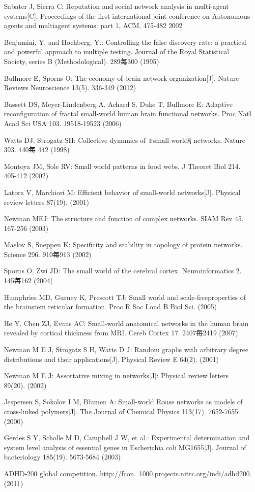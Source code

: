 \documentclass{llncs}
\begin{document}
\begin{thebibliography}{}
Sabater J, Sierra C:
Reputation and social network analysis in multi-agent systems[C].
Proceedings of the first international joint conference on Autonomous agents and multiagent systems: part 1, ACM. 475-482 2002

Benjamini, Y. and Hochberg, Y.:
Controlling the false discovery rate: a practical and powerful approach to multiple testing.
Journal of the Royal Statistical Society, series B (Methodological). 289每300 (1995)

Bullmore E, Sporns O:
The economy of brain network organization[J].
Nature Reviews Neuroscience 13(5). 336-349 (2012)

Bassett DS, Meyer-Lindenberg A, Achard S, Duke T, Bullmore E:
Adaptive reconfiguration of fractal small-world human brain functional networks.
Proc Natl Acad Sci USA 103. 19518-19523 (2006)

Watts DJ, Strogatz SH:
Collective dynamics of ※small-world§ networks.
Nature 393. 440每 442 (1998)

Montoya JM, Sole RV:
Small world patterns in food webs.
J Theoret Biol 214. 405-412 (2002)

Latora V, Marchiori M:
Efficient behavior of small-world networks[J].
Physical review letters 87(19). (2001)

Newman MEJ:
The structure and function of complex networks.
SIAM Rev 45. 167-256 (2003)

Maslov S, Sneppen K:
Specificity and stability in topology of protein networks.
Science 296. 910每913 (2002)

Sporns O, Zwi JD:
The small world of the cerebral cortex.
Neuroinformatics 2. 145每162 (2004)

Humphries MD, Gurney K, Prescott TJ:
Small world and scale-freeproperties of the brainstem reticular formation.
Proc R Soc Lond B Biol Sci. (2005)

He Y, Chen ZJ, Evans AC:
Small-world anatomical networks in the human brain revealed by cortical thickness from MRI.
Cereb Cortex 17. 2407每2419 (2007)

Newman M E J, Strogatz S H, Watts D J:
Random graphs with arbitrary degree distributions and their applications[J].
Physical Review E 64(2). (2001)

Newman M E J:
Assortative mixing in networks[J]:
Physical review letters 89(20). (2002)

Jespersen S, Sokolov I M, Blumen A:
Small-world Rouse networks as models of cross-linked polymers[J].
The Journal of Chemical Physics 113(17). 7652-7655 (2000)

Gerdes S Y, Scholle M D, Campbell J W, et al.:
Experimental determination and system level analysis of essential genes in Escherichia coli MG1655[J].
Journal of bacteriology 185(19). 5673-5684 (2003)

ADHD-200 global competition.
http://fcon\_1000.projects.nitrc.org/indi/adhd200. (2011)


\end{thebibliography}
\end{document}
